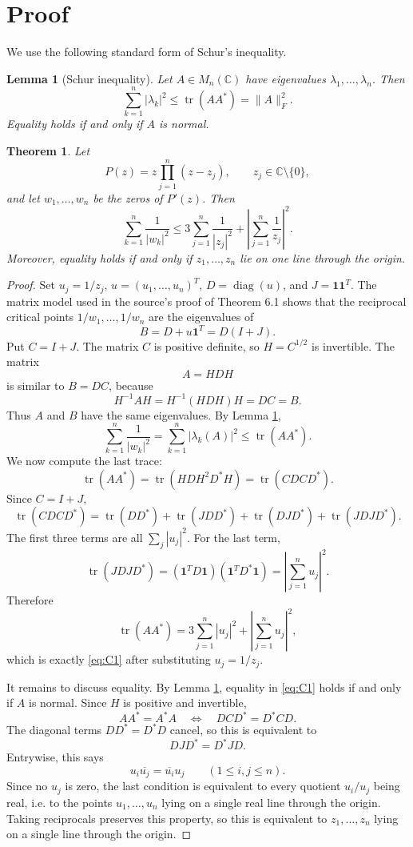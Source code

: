 \documentclass[11pt]{article}
\newtheorem{theorem}{Theorem}
\newtheorem{lemma}{Lemma}
\DeclareMathOperator{\diag}{diag}
\DeclareMathOperator{\tr}{tr}
\newcommand{\C}{\mathbb{C}}
\newcommand{\one}{\mathbf{1}}
\begin{document}
\section{Proof}

We use the following standard form of Schur's inequality.

\begin{lemma}[Schur inequality]\label{lem:schur}
Let \(A\in M_n(\C)\) have eigenvalues \(\lambda_1,\ldots,\lambda_n\). Then
\[
  \sum_{k=1}^n |\lambda_k|^2 \le \tr(AA^*)=\|A\|_F^2.
\]
Equality holds if and only if \(A\) is normal.
\end{lemma}

\begin{theorem}\label{thm:c1}
Let
\[
  P(z)=z\prod_{j=1}^n(z-z_j),\qquad z_j\in\C\setminus\{0\},
\]
and let \(w_1,\ldots,w_n\) be the zeros of \(P'(z)\). Then
\[
  \sum_{k=1}^n\frac1{|w_k|^2}
  \le
  3\sum_{j=1}^n\frac1{|z_j|^2}
  +\left|\sum_{j=1}^n\frac1{z_j}\right|^2.
\]
Moreover, equality holds if and only if \(z_1,\ldots,z_n\) lie on one line
through the origin.
\end{theorem}

\begin{proof}
Set \(u_j=1/z_j\), \(u=(u_1,\ldots,u_n)^T\), \(D=\diag(u)\), and
\(J=\one\one^T\).  The matrix model used in the source's proof of Theorem 6.1
shows that the reciprocal critical points \(1/w_1,\ldots,1/w_n\) are the
eigenvalues of
\[
  B=D+u\one^T = D(I+J).
\]
Put \(C=I+J\).  The matrix \(C\) is positive definite, so \(H=C^{1/2}\) is
invertible.  The matrix
\[
  A=HDH
\]
is similar to \(B=DC\), because
\[
  H^{-1}AH = H^{-1}(HDH)H = DC=B.
\]
Thus \(A\) and \(B\) have the same eigenvalues.  By Lemma \ref{lem:schur},
\[
  \sum_{k=1}^n\frac1{|w_k|^2}
  =\sum_{k=1}^n|\lambda_k(A)|^2
  \le \tr(AA^*).
\]
We now compute the last trace:
\[
  \tr(AA^*)=\tr(HDH^2D^*H)=\tr(CDCD^*).
\]
Since \(C=I+J\),
\[
  \tr(CDCD^*)
  =
  \tr(DD^*)+\tr(JDD^*)+\tr(DJD^*)+\tr(JDJD^*).
\]
The first three terms are all \(\sum_j |u_j|^2\).  For the last term,
\[
  \tr(JDJD^*)
  =(\one^T D\one)(\one^T D^*\one)
  =\left|\sum_{j=1}^n u_j\right|^2.
\]
Therefore
\[
  \tr(AA^*)
  =
  3\sum_{j=1}^n |u_j|^2
  +\left|\sum_{j=1}^n u_j\right|^2,
\]
which is exactly \eqref{eq:C1} after substituting \(u_j=1/z_j\).

It remains to discuss equality.  By Lemma \ref{lem:schur}, equality in
\eqref{eq:C1} holds if and only if \(A\) is normal.  Since \(H\) is positive
and invertible,
\[
  AA^*=A^*A
  \quad\Longleftrightarrow\quad
  DCD^*=D^*CD.
\]
The diagonal terms \(DD^*=D^*D\) cancel, so this is equivalent to
\[
  DJD^*=D^*JD.
\]
Entrywise, this says
\[
  u_i\overline{u_j}=\overline{u_i}u_j
  \qquad (1\le i,j\le n).
\]
Since no \(u_j\) is zero, the last condition is equivalent to every quotient
\(u_i/u_j\) being real, i.e. to the points \(u_1,\ldots,u_n\) lying on a single
real line through the origin.  Taking reciprocals preserves this property, so
this is equivalent to \(z_1,\ldots,z_n\) lying on a single line through the
origin.
\end{proof}
\end{document}
